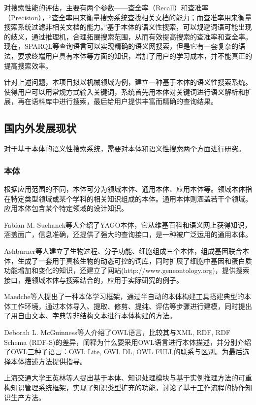 \documentclass[12pt,a4paper]{article}
\begin{document}
	对搜索性能的评估，主要有两个参数——查全率（{\Times Recall}）和查准率（{\Times Precision}），“查全率用来衡量搜索系统查找相关文档的能力；而查准率用来衡量搜索系统过滤非相关文档的能力。”\cite{4}基于本体的语义性搜索，可以规避词语可能出现的歧义，通过推理机，合理拓展搜索范围，从而有效提高搜索的查准率和查全率。现在，{\Times SPARQL}等查询语言可以实现精确的语义网搜索，但是它有一套复杂的语法，要求终端用户具有本体等方面的知识，增加了用户的学习成本，并不能真正的提高搜索效率。

	针对上述问题，本项目拟以机械领域为例，建立一种基于本体的语义性搜索系统。使得用户可以用常规方式输入关键词，系统首先用本体对关键词进行语义解析和扩展，再在语料库中进行搜索，最后给用户提供丰富而精确的查询结果。
	\subsection{国内外发展现状}
	对于基于本体的语义性搜索系统，需要对本体和语义性搜索两个方面进行研究。
		\subsubsection*{本体}
	根据应用范围的不同，本体可分为领域本体、通用本体、应用本体等。领域本体指在特定类型领域或某个学科的相关知识组成的本体。通用本体则涵盖若干个领域。应用本体包含某个特定领域的设计知识。
	
	{\Times Fabian M. Suchanek}等人介绍了{\Times YAGO}本体，它从维基百科和语义网上获得知识，涵盖面广，信息准确，还提供了强大的查询接口，是一种被广泛运用的通用本体\cite{5}。
	
	{\Times Ashburner}等人建立了生物过程、分子功能、细胞组成三个本体，组成基因联合本体，生成了一套用于真核生物的动态可控的词库，同时扩展了细胞中基因和蛋白质功能增加和变化的知识，还建立了网站({\Times http://www.geneontology.org})，提供搜索接口\cite{6}，是领域本体与搜索结合的，应用于实际研究的例子。
	
	{\Times Maedche}等人提出了一种本体学习框架，通过半自动的本体构建工具搭建典型的本体工作环境，通过本体导入、提取、修剪、提纯、评估等步骤进行建模，同时提出了用自由文本、字典等非结构文本进行本体构建的方法\cite{7}。
	
	{\Times Deborah L. McGuinness}等人介绍了{\Times OWL}语言，比较其与{\Times XML, RDF, RDF Schema (RDF-S)}的差异，阐释为什么要采用{\Times OWL}语言进行本体描述，并分别介绍了{\Times OWL}三种子语言：{\Times OWL Lite, OWL DL, OWL FULL}的联系与区别\cite{8}。为最后选择本体描述方法提供指导。
	
	上海交通大学王英林等人提出基于本体、知识处理模块与基于实例推理方法的可重构知识管理系统框架，实现了知识类型扩充的功能，讨论了基于工作流程的协作知识生产方法\cite{9}。
	
\end{document}
